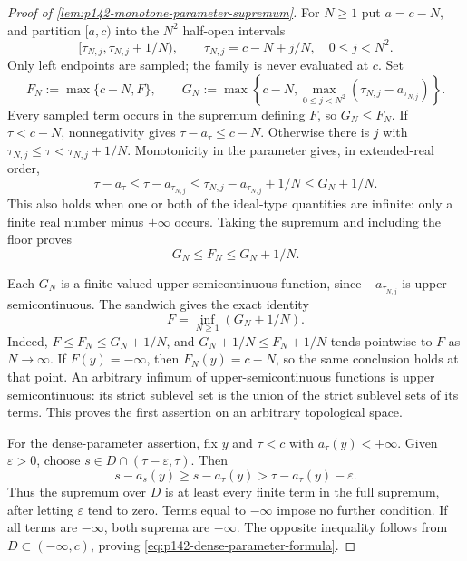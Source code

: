 \begin{proof}[Proof of \cref{lem:p142-monotone-parameter-supremum}]
For $N\geq1$ put $a=c-N$, and partition $[a,c)$ into the $N^2$
half-open intervals
\[
 [\tau_{N,j},\tau_{N,j}+1/N),\qquad
 \tau_{N,j}=c-N+j/N,\quad 0\leq j<N^2.
\]
Only left endpoints are sampled; the family is never evaluated at $c$.
Set
\[
 F_N:=\max\{c-N,F\},\qquad
 G_N:=\max\left\{c-N,
      \max_{0\leq j<N^2}
       (\tau_{N,j}-a_{\tau_{N,j}})\right\}.
\]
Every sampled term occurs in the supremum defining $F$, so $G_N\leq F_N$.
If $\tau<c-N$, nonnegativity gives $\tau-a_\tau\leq c-N$.
Otherwise there is $j$ with
$\tau_{N,j}\leq\tau<\tau_{N,j}+1/N$. Monotonicity in the parameter
gives, in extended-real order,
\[
 \tau-a_\tau
 \leq \tau-a_{\tau_{N,j}}
 \leq \tau_{N,j}-a_{\tau_{N,j}}+1/N
 \leq G_N+1/N.
\]
This also holds when one or both of the ideal-type quantities are infinite:
only a finite real number minus $+\infty$ occurs. Taking the supremum and
including the floor proves
\[
             G_N\leq F_N\leq G_N+1/N.
 \tag{71.33h}
 \label{eq:p142-grid-sandwich}
\]

Each $G_N$ is a finite-valued upper-semicontinuous function, since
$-a_{\tau_{N,j}}$ is upper semicontinuous. The sandwich gives the exact
identity
\[
                  F=\inf_{N\geq1}(G_N+1/N).
 \tag{71.33i}
 \label{eq:p142-usc-infimum}
\]
Indeed, $F\leq F_N\leq G_N+1/N$, and
$G_N+1/N\leq F_N+1/N$ tends pointwise to $F$ as $N\to\infty$.
If $F(y)=-\infty$, then $F_N(y)=c-N$, so the same conclusion holds
at that point. An arbitrary infimum of upper-semicontinuous functions is
upper semicontinuous: its strict sublevel set is the union of the strict
sublevel sets of its terms. This proves the first assertion on an
arbitrary topological space.

For the dense-parameter assertion, fix $y$ and $\tau<c$ with
$a_\tau(y)<+\infty$. Given $\varepsilon>0$, choose
$s\in D\cap(\tau-\varepsilon,\tau)$. Then
\[
 s-a_s(y)\geq s-a_\tau(y)
              >\tau-a_\tau(y)-\varepsilon.
\]
Thus the supremum over $D$ is at least every finite term in the full
supremum, after letting $\varepsilon$ tend to zero. Terms equal to
$-\infty$ impose no further condition. If all terms are $-\infty$,
both suprema are $-\infty$. The opposite inequality follows from
$D\subset(-\infty,c)$, proving
\eqref{eq:p142-dense-parameter-formula}.
\end{proof}


